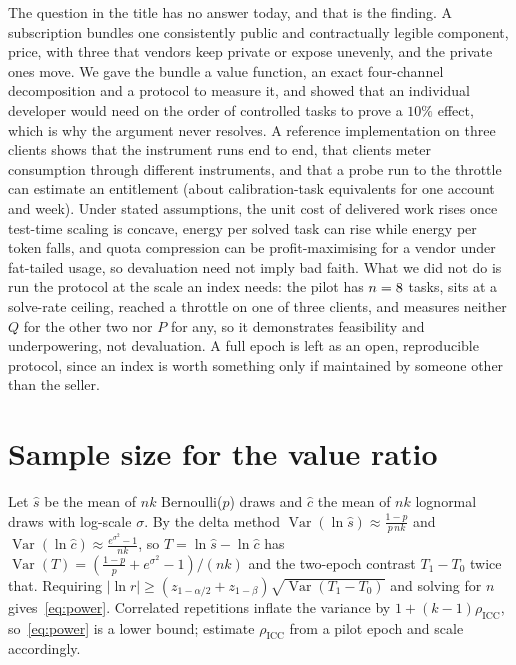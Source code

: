 \documentclass[conference]{IEEEtran}
\theoremstyle{plain}
\theoremstyle{definition}
\begin{document}
The question in the title has no answer today, and that is the finding. A
subscription bundles one consistently public and contractually legible
component, price, with three that vendors keep private or expose unevenly, and
the private ones move. We gave the bundle a value function, an exact
four-channel decomposition and a protocol to measure it, and showed that an
individual developer would need on the order of \nReqTen{} controlled tasks to
prove a $10\%$ effect, which is why the argument never resolves. A reference
implementation on three clients shows that the instrument runs end to end, that
clients meter consumption through different instruments, and that a probe run
to the throttle can estimate an entitlement (about \codexProbeQ{}
calibration-task equivalents for one account and week). Under stated
assumptions, the unit cost of delivered work rises once test-time scaling is
concave, energy per solved task can rise while energy per token falls, and
quota compression can be profit-maximising for a vendor under fat-tailed usage,
so devaluation need not imply bad faith. What we did not do is run the protocol
at the scale an index needs: the pilot has $n=8$ tasks, sits at a
solve-rate ceiling, reached a throttle on one of three clients, and measures
neither $Q$ for the other two nor $P$ for any, so it demonstrates feasibility
and underpowering, not devaluation. A full epoch is left as an open,
reproducible protocol, since an index is worth something only if maintained by
someone other than the seller.

\appendices

\section{Sample size for the value ratio}
\label{app:power}

Let $\hat s$ be the mean of $nk$ Bernoulli($p$) draws and $\hat c$ the mean of
$nk$ lognormal draws with log-scale $\sigma$. By the delta method
$\operatorname{Var}(\ln\hat s)\approx\frac{1-p}{p\,nk}$ and
$\operatorname{Var}(\ln\hat c)\approx\frac{e^{\sigma^2}-1}{nk}$, so
$T=\ln\hat s-\ln\hat c$ has
$\operatorname{Var}(T)=\left(\frac{1-p}{p}+e^{\sigma^2}-1\right)/(nk)$ and the
two-epoch contrast $T_1-T_0$ twice that. Requiring
$|\ln r|\ge(z_{1-\alpha/2}+z_{1-\beta})\sqrt{\operatorname{Var}(T_1-T_0)}$ and
solving for $n$ gives~\eqref{eq:power}. Correlated repetitions inflate the
variance by $1+(k-1)\rho_{\text{ICC}}$, so~\eqref{eq:power} is a lower bound;
estimate $\rho_{\text{ICC}}$ from a pilot epoch and scale accordingly.

\balance


\end{document}
